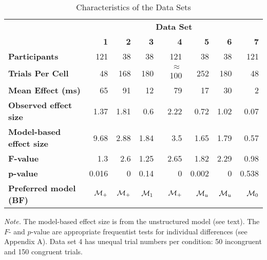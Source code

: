 \documentclass[american,man]{apa6}
\begin{document}
\begin{table}[tbp]
\begin{center}
\begin{threeparttable}
\caption{Characteristics of the Data Sets}
\begin{tabular}{lrrrrrrr}
\toprule
 & \multicolumn{7}{c}{\bf{Data Set}} \\
\cmidrule(r){2-8}
 & \bf{1} & \bf{2} & \bf{3} & \bf{4} & \bf{5} & \bf{6} & \bf{7}\\
\bf{Participants} & 121 & 38 & 38 & 121 & 38 & 38 & 121\\
\bf{Trials Per Cell} & 48 & 168 & 180 & $\approx$ 100 & 252 & 180 & 48\\
\bf{Mean Effect (ms)} & 65 & 91 & 12 & 79 & 17 & 30 & 2\\
\bf{Observed effect size} & 1.37 & 1.81 & 0.6 & 2.22 & 0.72 & 1.02 & 0.07\\
\bf{Model-based effect size} & 9.68 & 2.88 & 1.84 & 3.5 & 1.65 & 1.79 & 0.57\\
\bf{F-value} & 1.3 & 2.6 & 1.25 & 2.65 & 1.82 & 2.29 & 0.98\\
\bf{p-value} & 0.016 & 0 & 0.14 & 0 & 0.002 & 0 & 0.538\\
\bf{Preferred model (BF)} & ${\cal M}_+$ & ${\cal M}_+$ & ${\cal M}_1$ & ${\cal M}_+$ & ${\cal M}_u$ & ${\cal M}_u$ & ${\cal M}_0$\\
\bottomrule
\end{tabular}
\begin{tablenotes}[para]
\textit{Note.} The model-based effect size is from the unstructured model (see text).  The $F$- and $p$-value are appropriate frequentist tests for individual differences (see Appendix A).  Data set 4 has unequal trial numbers per condition: 50 incongruent and 150 congruent trials.
\end{tablenotes}
\end{threeparttable}
\end{center}
\end{table}
\end{document}
